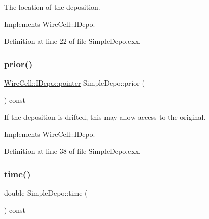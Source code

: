 The location of the deposition. 



Implements \hyperlink{class_wire_cell_1_1_i_depo_a6ea54d469c6d0429d16425917ec24241}{Wire\+Cell\+::\+I\+Depo}.



Definition at line 22 of file Simple\+Depo.\+cxx.

\mbox{\label{class_wire_cell_1_1_simple_depo_a23c734fee4ed0184b032e99a193f6f8e}} 
\subsubsection{\texorpdfstring{prior()}{prior()}}
{\footnotesize\ttfamily \hyperlink{class_wire_cell_1_1_i_data_aff870b3ae8333cf9265941eef62498bc}{Wire\+Cell\+::\+I\+Depo\+::pointer} Simple\+Depo\+::prior (\begin{DoxyParamCaption}{ }\end{DoxyParamCaption}) const\hspace{0.3cm}{\ttfamily [virtual]}}



If the deposition is drifted, this may allow access to the original. 



Implements \hyperlink{class_wire_cell_1_1_i_depo_a440532d005a463cc9df5731ddb96f601}{Wire\+Cell\+::\+I\+Depo}.



Definition at line 38 of file Simple\+Depo.\+cxx.

\mbox{\label{class_wire_cell_1_1_simple_depo_aadb43cf11d4612fcad2279b9a32d697a}} 
\subsubsection{\texorpdfstring{time()}{time()}}
{\footnotesize\ttfamily double Simple\+Depo\+::time (\begin{DoxyParamCaption}{ }\end{DoxyParamCaption}) const\hspace{0.3cm}{\ttfamily [virtual]}}

